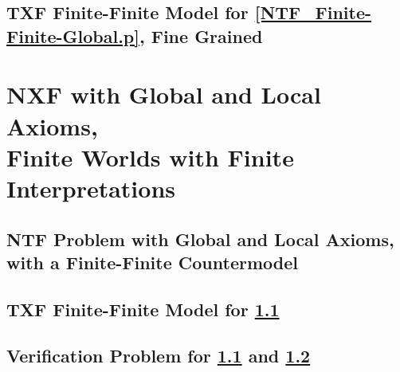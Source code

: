 \documentclass{easychair}
\begin{document}
\newpage
\subsection{TXF Finite-Finite Model for \ref{NTF_Finite-Finite-Global.p}, Fine Grained}
\label{NTF_Finite-Finite-Global_Fine.s}
\begin{small}

\end{small}

\newpage
\section{NXF with Global and Local Axioms, \\
         Finite Worlds with Finite Interpretations}
\label{NXFLocal}

\subsection{NTF Problem with Global and Local Axioms, \\
            with a Finite-Finite Countermodel}
\label{NTF_Finite-Finite-Local.p}
\begin{small}

\end{small}

\newpage
\subsection{TXF Finite-Finite Model for \ref{NTF_Finite-Finite-Local.p}}
\label{NTF_Finite-Finite-Local.s}
\begin{small}

\end{small}

\newpage
\subsection{Verification Problem for \ref{NTF_Finite-Finite-Local.p} and
\ref{NTF_Finite-Finite-Local.s}}
\label{NTF_Finite-Finite-Local.s.p}
\begin{small}

\end{small}

\end{document}
